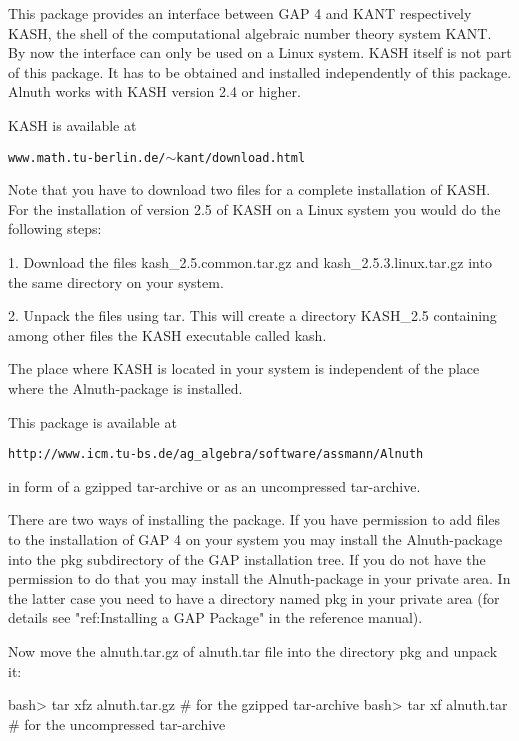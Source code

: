 

This package provides an interface between GAP 4 and KANT respectively
KASH, the shell of the computational algebraic number theory system KANT. By
now the interface can only be used on a Linux system.  KASH itself is not part
of this package.  It has to be obtained and installed independently of this
package. Alnuth works with KASH version 2.4 or higher.

 
KASH is available at
\smallskip 
          \centerline{\tt www.math.tu-berlin.de/$\sim$kant/download.html}
\smallskip 
Note that you have to download two files for a complete installation
of KASH. For the installation of version 2.5 of KASH on a Linux
system you would do the following steps:
{\parindent=25pt
\item{1.} Download the files
    kash_2.5.common.tar.gz and kash_2.5.3.linux.tar.gz
    into the same directory on your system.
 
\item{2.} Unpack the files using tar.  This will create a directory
    KASH_2.5 containing among other files the KASH executable called
    kash.
\smallskip
}
The place where KASH is located in your system is independent of the place
 where the Alnuth-package is installed.

 
This package is available at
\smallskip 
   \centerline{\tt http://www.icm.tu-bs.de/ag_algebra/software/assmann/Alnuth}
 
in form of a gzipped tar-archive or as an uncompressed tar-archive.
 
There are two ways of installing the package.  If you have permission
to add files to the installation of GAP 4 on your system you may
install the Alnuth-package into the pkg subdirectory of the GAP
installation tree.  If you do not have the permission to do that you
may install the Alnuth-package in your private area. In the latter case you
need to have a directory named pkg in your private area (for details see
"ref:Installing a GAP Package" in the reference manual). 

Now move the alnuth.tar.gz of alnuth.tar file into the directory pkg and
unpack it:

\beginexample
    bash> tar xfz alnuth.tar.gz        # for the gzipped tar-archive
    bash> tar xf alnuth.tar         # for the uncompressed tar-archive
\endexample

